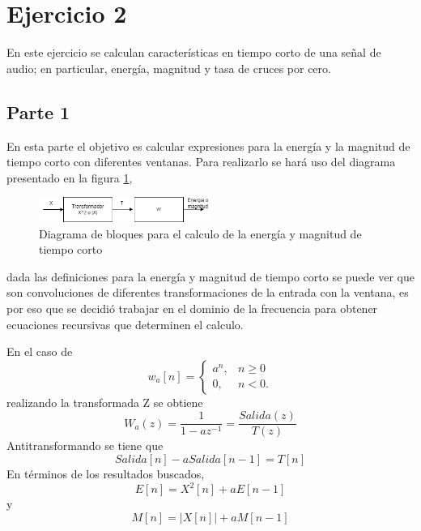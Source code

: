 \documentclass[a4paper]{article}
\begin{document}
\section{Ejercicio 2}
En este ejercicio se calculan características en tiempo corto de una señal de audio; en particular, energía, magnitud y tasa de cruces por cero.
\subsection{Parte 1}
En esta parte el objetivo es calcular expresiones para la energía y la magnitud de tiempo corto con diferentes ventanas. Para realizarlo se hará uso del diagrama presentado en la figura \ref{diagrama},
\begin{figure}[h]
\centering
\includegraphics[width=0.5\textwidth]{drawio.png}
\caption{Diagrama de bloques para el calculo de la energía y magnitud de tiempo corto}
\label{diagrama}
\end{figure}
dada las definiciones para la energía y magnitud de tiempo corto se puede ver que son convoluciones de diferentes transformaciones de la entrada con la ventana, es por eso que se decidió trabajar en el dominio de la frecuencia para obtener ecuaciones recursivas que determinen el calculo. 

\newline
En el caso de 
		$$w_a[n]=
			\begin{cases}
				a^n, & n \geq 0 \\
				0, & n < 0.
		\end{cases}	$$
realizando la transformada Z se obtiene 
$$
W_a(z) = \frac{1}{1-az^{-1}} = \frac{Salida(z)}{T(z)}
$$
Antitransformando se tiene que 
$$
Salida[n] - aSalida[n-1] = T[n]
$$
En términos de los resultados buscados,
$$
E[n] = X^2[n] + aE[n-1]
$$
y 
$$
M[n] = |X[n]| +aM[n-1]
$$
\end{document}
